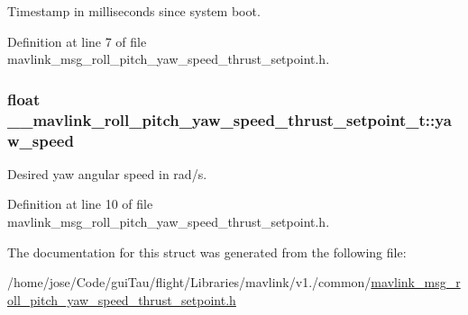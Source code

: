 Timestamp in milliseconds since system boot. 



Definition at line 7 of file mavlink\-\_\-msg\-\_\-roll\-\_\-pitch\-\_\-yaw\-\_\-speed\-\_\-thrust\-\_\-setpoint.\-h.

\hypertarget{struct____mavlink__roll__pitch__yaw__speed__thrust__setpoint__t_a7656a62ad9ee1291a5917486d5610633}{
\subsubsection[{yaw\-\_\-speed}]{\setlength{\rightskip}{0pt plus 5cm}float \-\_\-\-\_\-mavlink\-\_\-roll\-\_\-pitch\-\_\-yaw\-\_\-speed\-\_\-thrust\-\_\-setpoint\-\_\-t\-::yaw\-\_\-speed}}\label{struct____mavlink__roll__pitch__yaw__speed__thrust__setpoint__t_a7656a62ad9ee1291a5917486d5610633}


Desired yaw angular speed in rad/s. 



Definition at line 10 of file mavlink\-\_\-msg\-\_\-roll\-\_\-pitch\-\_\-yaw\-\_\-speed\-\_\-thrust\-\_\-setpoint.\-h.



The documentation for this struct was generated from the following file\-:\begin{DoxyCompactItemize}
\item 
/home/jose/\-Code/gui\-Tau/flight/\-Libraries/mavlink/v1./common/\hyperlink{mavlink__msg__roll__pitch__yaw__speed__thrust__setpoint_8h}{mavlink\-\_\-msg\-\_\-roll\-\_\-pitch\-\_\-yaw\-\_\-speed\-\_\-thrust\-\_\-setpoint.\-h}\end{DoxyCompactItemize}

